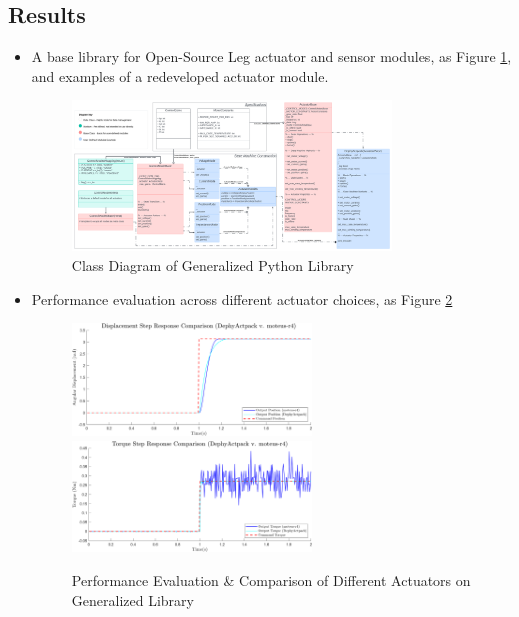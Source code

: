 \documentclass[12pt]{article}
\begin{document}
\subsection{Results}


\begin{itemize}

    \item{A base library for Open-Source Leg actuator and sensor modules, as Figure \ref*{Python Lib Class Diagram}, and examples of a redeveloped actuator module.}
    
    \begin{figure}[H]
        \centering
        \includegraphics[width=0.8\textwidth]{portfolio/Class Diagram Base Lib.png}
        \caption{Class Diagram of Generalized Python Library}
        \label{Python Lib Class Diagram}
    \end{figure}
    \item {Performance evaluation across different actuator choices, as Figure \ref{Dephy-Moteus Comp}}
    
    \begin{figure}[H]
        \centering
        \includegraphics[width=0.6\textwidth]{portfolio/position_comp.png}
        \includegraphics[width=0.6\textwidth]{portfolio/torque_comp.png}
        \caption{Performance Evaluation \& Comparison of Different Actuators on Generalized Library}
        \label{Dephy-Moteus Comp}
    \end{figure}
    

\end{itemize}
\end{document}
